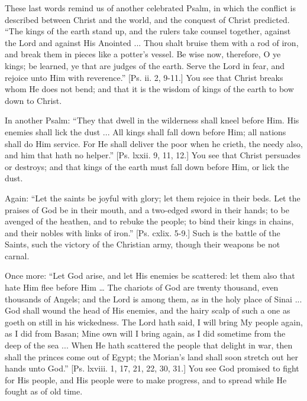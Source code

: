 These last words remind us of another celebrated Psalm, in which
the conflict is described between Christ and the world, and the
conquest of Christ predicted. ``The kings of the earth stand up,
and the rulers take counsel together, against the Lord and against His
Anointed ... Thou shalt bruise them with a rod of iron, and break them
in pieces like a potter's vessel. Be wise now, therefore, O ye kings;
be learned, ye that are judges of the earth. Serve the Lord in fear,
and rejoice unto Him with reverence.'' [Ps. ii. 2, 9-11.] You see
that Christ breaks whom He does not bend; and that it is the wisdom of
kings of the earth to bow down to Christ.

In another Psalm: ``They that dwell in the wilderness shall
kneel before Him. His enemies shall lick the dust ... All kings shall
fall down before Him; all nations shall do Him service. For He shall
deliver the poor when he crieth, the needy also, and him that hath no
helper.'' [Ps. lxxii. 9, 11, 12.] You see that Christ persuades or
destroys; and that kings of the earth must fall down before Him, or
lick the dust.

Again: ``Let the saints be joyful with glory; let them rejoice
in their beds. Let the praises of God be in their mouth, and a
two-edged sword in their hands; to be avenged of the heathen, and to
rebuke the people; to bind their kings in chains, and their nobles
with links of iron.'' [Ps. cxlix. 5-9.] Such is the battle of the
Saints, such the victory of the Christian army, though their weapons
be not carnal.

Once more: ``Let God arise, and let His enemies be scattered:
let them also that hate Him flee before Him … The chariots of God
are twenty thousand, even thousands of Angels; and the Lord is among
them, as in the holy place of Sinai ... God shall wound the head of
His enemies, and the hairy scalp of such a one as goeth on still in
his wickedness. The Lord hath said, I will bring My people again, as I
did from Basan; Mine own will I bring again, as I did sometime from
the deep of the sea ... When He hath scattered the people that delight
in war, then shall the princes come out of Egypt; the Morian's land
shall soon stretch out her hands unto God.'' [Ps. lxviii. 1, 17,
21, 22, 30, 31.] You see God promised to fight for His people, and His
people were to make progress, and to spread while He fought as of old
time.

